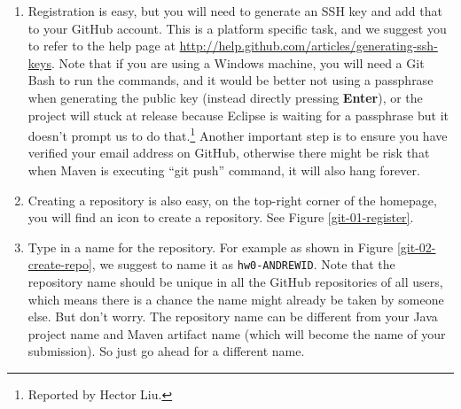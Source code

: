 \begin{enumerate}

\item Registration is easy, but you will need to generate an SSH key and add
that to your GitHub account. This is a platform specific task, and we suggest
you to refer to the help page at
\url{http://help.github.com/articles/generating-ssh-keys}. Note that if you are
using a Windows machine, you will need a Git Bash to run the commands, and it
would be better not using a passphrase when generating the public key (instead
directly pressing \textbf{Enter}), or the project will stuck at release because
Eclipse is waiting for a passphrase but it doesn't prompt us to do
that.\footnote{Reported by Hector Liu.} Another important step is to ensure you
have verified your email address on GitHub, otherwise there might be risk that
when Maven is executing ``git push'' command, it will also hang forever.


\item Creating a repository is also easy, on the top-right corner of the
homepage, you will find an icon to create a repository. See Figure
\ref{git-01-register}.

\item Type in a name for the repository. For example as shown in Figure
\ref{git-02-create-repo}, we suggest to name it as \texttt{hw0-ANDREWID}. Note
that the repository name should be unique in all the GitHub repositories of all
users, which means there is a chance the name might already be taken by someone
else. But don't worry. The repository name can be different from your Java
project name and Maven artifact name (which will become the name of your
submission). So just go ahead for a different name.


\end{enumerate}
